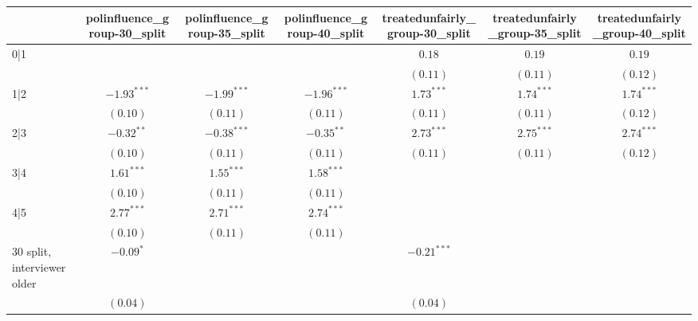 
\usepackage{booktabs}
\usepackage{threeparttable}

\begin{table}
\begin{center}
\begin{threeparttable}
\begin{tabular}{l c c c c c c}
\toprule
 & polinfluence_group-30_split & polinfluence_group-35_split & polinfluence_group-40_split & treatedunfairly_group-30_split & treatedunfairly_group-35_split & treatedunfairly_group-40_split \\
\midrule
0|1                             &               &               &               & $0.18$        & $0.19$        & $0.19$        \\
                                &               &               &               & $(0.11)$      & $(0.11)$      & $(0.12)$      \\
1|2                             & $-1.93^{***}$ & $-1.99^{***}$ & $-1.96^{***}$ & $1.73^{***}$  & $1.74^{***}$  & $1.74^{***}$  \\
                                & $(0.10)$      & $(0.11)$      & $(0.11)$      & $(0.11)$      & $(0.11)$      & $(0.12)$      \\
2|3                             & $-0.32^{**}$  & $-0.38^{***}$ & $-0.35^{**}$  & $2.73^{***}$  & $2.75^{***}$  & $2.74^{***}$  \\
                                & $(0.10)$      & $(0.11)$      & $(0.11)$      & $(0.11)$      & $(0.11)$      & $(0.12)$      \\
3|4                             & $1.61^{***}$  & $1.55^{***}$  & $1.58^{***}$  &               &               &               \\
                                & $(0.10)$      & $(0.11)$      & $(0.11)$      &               &               &               \\
4|5                             & $2.77^{***}$  & $2.71^{***}$  & $2.74^{***}$  &               &               &               \\
                                & $(0.10)$      & $(0.11)$      & $(0.11)$      &               &               &               \\
30 split, interviewer older     & $-0.09^{*}$   &               &               & $-0.21^{***}$ &               &               \\
                                & $(0.04)$      &               &               & $(0.04)$      &               &               \\

\end{tabular}
\end{threeparttable}
\end{center}
\end{table}
